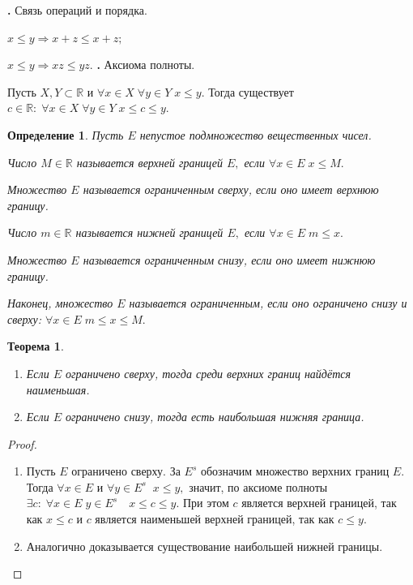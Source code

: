 \documentclass{article}
\newcommand{\RomanNumeralCaps}[1]
    {\MakeUppercase{\romannumeral #1}}
\newtheorem{Theorem}{Теорема}[section]
\newtheorem{Definition}{Определение}[section]
\begin{document}
{\bf \RomanNumeralCaps{5}.} Связь операций и порядка.

$x\leq y \Rightarrow x+z\leq x+z;$

$x\leq y \Rightarrow xz\leq yz.$
\newpage
{\bf \RomanNumeralCaps{6}.} Аксиома полноты.

Пусть $X, Y\subset \mathbb{R}$ и $\forall x\in X \; \forall y\in Y \; x\leq y.$ Тогда существует $c\in\mathbb{R}: \; \forall x\in X \; \forall y\in Y \; x\leq c\leq y.$
\begin{figure}[h]
\end{figure}


\begin{Definition}
Пусть $E$ непустое подмножество вещественных чисел.

Число $M\in\mathbb{R}$ называется верхней границей $E,$ если $\forall x\in E\; x\leq M.$

Множество $E$ называется ограниченным сверху, если оно имеет верхнюю границу.

Число $m\in\mathbb{R}$ называется нижней границей $E,$ если $\forall x\in E\; m\leq x.$

Множество $E$ называется ограниченным снизу, если оно имеет нижнюю границу.

Наконец, множество $E$ называется ограниченным, если оно ограничено снизу и сверху: $\forall x\in E\; m\leq x\leq M.$
\end{Definition}

\begin{Theorem}
\begin{enumerate}
\item Если $E$ ограничено сверху, тогда среди верхних границ найдётся наименьшая.
\item Если $E$ ограничено снизу, тогда есть наибольшая нижняя граница.
\end{enumerate}
\end{Theorem}
\begin{proof}
\begin{enumerate}
\item Пусть $E$ ограничено сверху. За $E^s$ обозначим множество верхних границ $E.$ Тогда $\forall x\in E$ и $\forall y\in E^s \;\; x\leq y,$ значит, по аксиоме полноты $\exists c: \; \forall x\in E\; y\in E^s \quad x\leq c\leq y.$ При этом $c$ является верхней границей, так как $x\leq c$ и $c$ является наименьшей верхней границей, так как $c\leq y.$
\item Аналогично доказывается существование наибольшей нижней границы.
\end{enumerate}
\end{proof}
\end{document}
